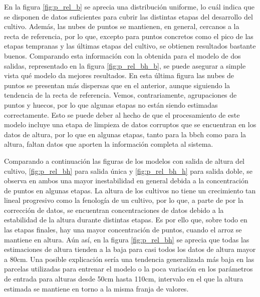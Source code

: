 \par En la figura \ref{fig:p_rel_b} se aprecia una distribución uniforme, lo cuál indica que se disponen de datos suficientes para cubrir las distintas etapas del desarrollo del cultivo. Además, las nubes de puntos se mantienen, en general, cercanos a la recta de referencia, por lo que, excepto para puntos concretos como el pico de las etapas tempranas y las últimas etapas del cultivo, se obtienen resultados bastante buenos. Comparando esta información con la obtenida para el modelo de dos salidas, representado en la figura \ref{fig:p_rel_bh_b}, se puede asegurar a simple vista qué modelo da mejores resultados. En esta última figura las nubes de puntos se presentan más dispersas que en el anterior, aunque siguiendo la tendencia de la recta de referencia. Vemos, contrariamente, agrupaciones de puntos y huecos, por lo que algunas etapas no están siendo estimadas correctamente. Esto se puede deber al hecho de que el procesamiento de este modelo incluye una etapa de limpieza de datos corruptos que se encuentran en los datos de altura, por lo que en algunas etapas, tanto para la \gls{bbch} como  para la altura, faltan datos que aporten la información completa al sistema. 
\\
\par Comparando a continuación las figuras de los modelos con salida de altura del cultivo, \ref{fig:p_rel_bh} para salida única y \ref{fig:p_rel_bh_h} para salida doble, se observa en ambos una mayor inestabilidad en general debida a la concentración de puntos en algunas etapas. La altura de los cultivos no tiene un crecimiento tan lineal progresivo como la fenología de un cultivo, por lo que, a parte de por la corrección de datos, se encuentran concentraciones de datos debido a la estabilidad de la altura durante distintas etapas. Es por ello que, sobre todo en las etapas finales, hay una mayor concentración de puntos, cuando el arroz se mantiene en altura. Aún así, en la figura \ref{fig:p_rel_bh} se aprecia que todas las estimaciones de altura tienden a la baja para casi todos los datos de altura mayor a 80cm. Una posible explicación sería una tendencia generalizada más baja en las parcelas utilizadas para entrenar el modelo o la poca variación en los parámetros de entrada para alturas desde 50cm hasta 110cm, intervalo en el que la altura estimada se mantiene en torno a la misma franja de valores. 

